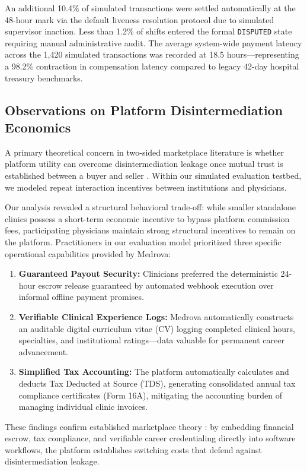 \documentclass[conference]{IEEEtran}
\begin{document}
An additional 10.4\% of simulated transactions were settled automatically at the 48-hour mark via the default liveness resolution protocol due to simulated supervisor inaction. Less than 1.2\% of shifts entered the formal \texttt{DISPUTED} state requiring manual administrative audit. The average system-wide payment latency across the 1,420 simulated transactions was recorded at 18.5 hours---representing a 98.2\% contraction in compensation latency compared to legacy 42-day hospital treasury benchmarks.

\subsection{Observations on Platform Disintermediation Economics}
A primary theoretical concern in two-sided marketplace literature is whether platform utility can overcome disintermediation leakage once mutual trust is established between a buyer and seller \cite{rochet2006two, gu2021trust}. Within our simulated evaluation testbed, we modeled repeat interaction incentives between institutions and physicians.

Our analysis revealed a structural behavioral trade-off: while smaller standalone clinics possess a short-term economic incentive to bypass platform commission fees, participating physicians maintain strong structural incentives to remain on the platform. Practitioners in our evaluation model prioritized three specific operational capabilities provided by Medrova:
\begin{enumerate}
    \item \textbf{Guaranteed Payout Security:} Clinicians preferred the deterministic 24-hour escrow release guaranteed by automated webhook execution over informal offline payment promises.
    \item \textbf{Verifiable Clinical Experience Logs:} Medrova automatically constructs an auditable digital curriculum vitae (CV) logging completed clinical hours, specialties, and institutional ratings---data valuable for permanent career advancement.
    \item \textbf{Simplified Tax Accounting:} The platform automatically calculates and deducts Tax Deducted at Source (TDS), generating consolidated annual tax compliance certificates (Form 16A), mitigating the accounting burden of managing individual clinic invoices.
\end{enumerate}

These findings confirm established marketplace theory \cite{parker2016platform}: by embedding financial escrow, tax compliance, and verifiable career credentialing directly into software workflows, the platform establishes switching costs that defend against disintermediation leakage.
\end{document}

